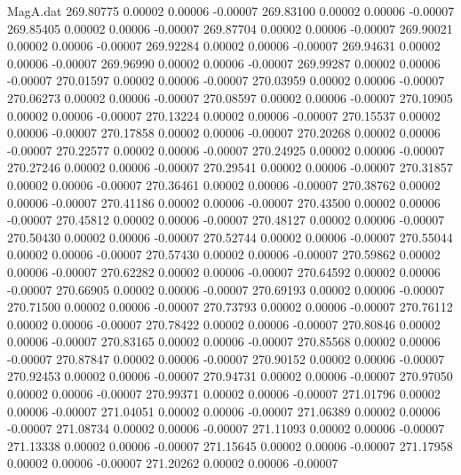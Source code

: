\begin{filecontents}{MagA.dat}
 269.80775    0.00002    0.00006   -0.00007
 269.83100    0.00002    0.00006   -0.00007
 269.85405    0.00002    0.00006   -0.00007
 269.87704    0.00002    0.00006   -0.00007
 269.90021    0.00002    0.00006   -0.00007
 269.92284    0.00002    0.00006   -0.00007
 269.94631    0.00002    0.00006   -0.00007
 269.96990    0.00002    0.00006   -0.00007
 269.99287    0.00002    0.00006   -0.00007
 270.01597    0.00002    0.00006   -0.00007
 270.03959    0.00002    0.00006   -0.00007
 270.06273    0.00002    0.00006   -0.00007
 270.08597    0.00002    0.00006   -0.00007
 270.10905    0.00002    0.00006   -0.00007
 270.13224    0.00002    0.00006   -0.00007
 270.15537    0.00002    0.00006   -0.00007
 270.17858    0.00002    0.00006   -0.00007
 270.20268    0.00002    0.00006   -0.00007
 270.22577    0.00002    0.00006   -0.00007
 270.24925    0.00002    0.00006   -0.00007
 270.27246    0.00002    0.00006   -0.00007
 270.29541    0.00002    0.00006   -0.00007
 270.31857    0.00002    0.00006   -0.00007
 270.36461    0.00002    0.00006   -0.00007
 270.38762    0.00002    0.00006   -0.00007
 270.41186    0.00002    0.00006   -0.00007
 270.43500    0.00002    0.00006   -0.00007
 270.45812    0.00002    0.00006   -0.00007
 270.48127    0.00002    0.00006   -0.00007
 270.50430    0.00002    0.00006   -0.00007
 270.52744    0.00002    0.00006   -0.00007
 270.55044    0.00002    0.00006   -0.00007
 270.57430    0.00002    0.00006   -0.00007
 270.59862    0.00002    0.00006   -0.00007
 270.62282    0.00002    0.00006   -0.00007
 270.64592    0.00002    0.00006   -0.00007
 270.66905    0.00002    0.00006   -0.00007
 270.69193    0.00002    0.00006   -0.00007
 270.71500    0.00002    0.00006   -0.00007
 270.73793    0.00002    0.00006   -0.00007
 270.76112    0.00002    0.00006   -0.00007
 270.78422    0.00002    0.00006   -0.00007
 270.80846    0.00002    0.00006   -0.00007
 270.83165    0.00002    0.00006   -0.00007
 270.85568    0.00002    0.00006   -0.00007
 270.87847    0.00002    0.00006   -0.00007
 270.90152    0.00002    0.00006   -0.00007
 270.92453    0.00002    0.00006   -0.00007
 270.94731    0.00002    0.00006   -0.00007
 270.97050    0.00002    0.00006   -0.00007
 270.99371    0.00002    0.00006   -0.00007
 271.01796    0.00002    0.00006   -0.00007
 271.04051    0.00002    0.00006   -0.00007
 271.06389    0.00002    0.00006   -0.00007
 271.08734    0.00002    0.00006   -0.00007
 271.11093    0.00002    0.00006   -0.00007
 271.13338    0.00002    0.00006   -0.00007
 271.15645    0.00002    0.00006   -0.00007
 271.17958    0.00002    0.00006   -0.00007
 271.20262    0.00002    0.00006   -0.00007

\end{filecontents}

